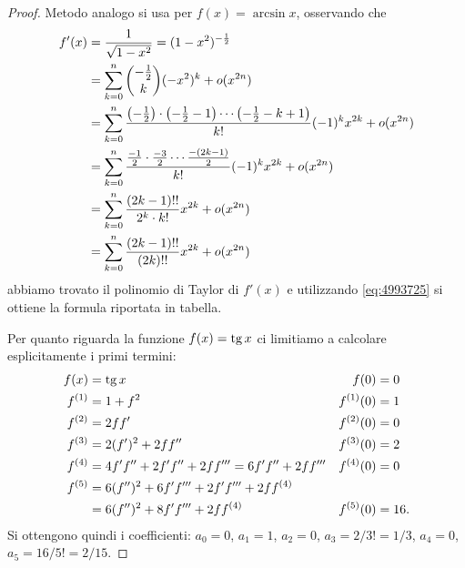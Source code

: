 \begin{proof}
Metodo analogo si usa per $f(x)=\arcsin x$, osservando che
\begin{align*}
  f'(x) &= \frac{1}{\sqrt{1-x^2}}
  = (1-x^2)^{-\frac 1 2} \\
  &= \sum_{k=0}^n {-\frac 1 2 \choose k} (-x^2)^k + o(x^{2n}) \\
  &= \sum_{k=0}^n \frac{{\left( -\frac 1 2 \right)}\cdot {\left( -\frac 1 2 - 1 \right)}\cdots {\left( -\frac 1 2 - k+1 \right)}}{k!}(-1)^k x^{2k} + o(x^{2n}) \\
  &= \sum_{k=0}^n \frac{\frac{-1}{2} \cdot \frac{-3}{2}\cdots \frac{-(2k-1)}{2}}{k!}(-1)^k x^{2k} + o(x^{2n}) \\
  &= \sum_{k=0}^n \frac{(2k-1)!!}{2^k \cdot k!}x^{2k} + o(x^{2n}) \\
  &= \sum_{k=0}^n \frac{(2k-1)!!}{(2k)!!}x^{2k} + o(x^{2n})
 \end{align*}
abbiamo trovato il polinomio di Taylor di $f'(x)$ e utilizzando \eqref{eq:4993725}
si ottiene la formula riportata in tabella.

Per quanto riguarda la funzione $f(x) = \operatorname{tg} x$ ci limitiamo a calcolare esplicitamente i primi termini:
\begin{align*}
  f(x) &= \operatorname{tg} x
  & f(0)&=0\\
  f^{(1)} &= 1+ f^2
  & f^{(1)}(0) &= 1\\
  f^{(2)} &= 2ff'
  & f^{(2)}(0) &= 0 \\
  f^{(3)} &= 2(f')^2 + 2f f''
  & f^{(3)}(0) &= 2 \\
  f^{(4)} &= 4 f' f'' + 2 f' f'' + 2 f f''' = 6 f' f'' + 2 f f'''
   & f^{(4)}(0) &= 0 \\
   f^{(5)} &= 6 (f'')^2 + 6 f' f''' + 2 f' f''' + 2 f f^{(4)}&&\\
           &= 6 (f'')^2 + 8 f' f''' + 2 f f^{(4)}
    & f^{(5)}(0) &= 16.
\end{align*}
Si ottengono quindi i coefficienti:
 $a_0 = 0$, $a_1 = 1$, $a_2 = 0$, $a_3 = 2/3! = 1/3$, $a_4=0$, $a_5 = 16/ 5! = 2/15$.
\end{proof}

